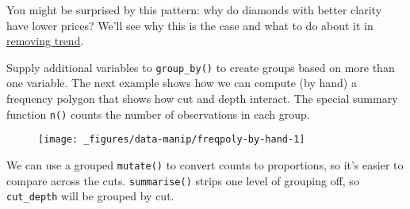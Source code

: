 You might be surprised by this pattern: why do diamonds with better
clarity have lower prices? We'll see why this is the case and what to do
about it in \hyperref[sub:trend]{removing trend}.

Supply additional variables to \texttt{group\_by()} to create groups
based on more than one variable. The next example shows how we can
compute (by hand) a frequency polygon that shows how cut and depth
interact. The special summary function \texttt{n()} counts the number of
observations in each group.

\begin{Shaded}
\begin{Highlighting}[]
\StringTok{ }\NormalTok{(} \NormalTok{())}
\StringTok{ }\StringTok{ }\StringTok{ }\NormalTok{)}
\CommentTok{#> }

 \StringTok{ }
\StringTok{  }\NormalTok{()}
\end{Highlighting}
\end{Shaded}

\begin{figure}[H]
  \centering
  \texttt{[image: \_figures/data-manip/freqpoly-by-hand-1]}
\end{figure}

We can use a grouped \texttt{mutate()} to convert counts to proportions,
so it's easier to compare across the cuts. \texttt{summarise()} strips
one level of grouping off, so \texttt{cut\_depth} will be grouped by
cut.

\begin{Shaded}
\begin{Highlighting}[]
\StringTok{ } \StringTok{ }
 \StringTok{ }
\StringTok{  }\NormalTok{()}
\end{Highlighting}
\end{Shaded}

